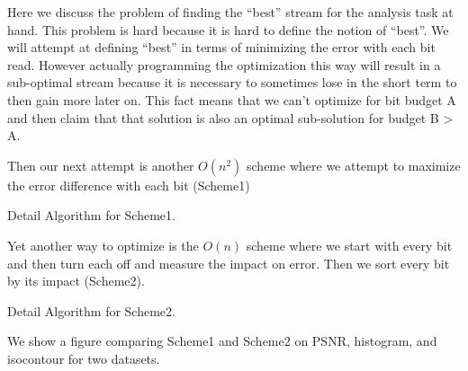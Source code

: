 Here we discuss the problem of finding the ``best'' stream for the analysis task at hand. This problem is hard because it is hard to define the notion of ``best''. We will attempt at defining ``best'' in terms of minimizing the error with each bit read. However actually programming the optimization this way will result in a sub-optimal stream because it is necessary to sometimes lose in the short term to then gain more later on. This fact means that we can't optimize for bit budget A and then claim that that solution is also an optimal sub-solution for budget B > A.

Then our next attempt is another $O(n^2)$ scheme where we attempt to maximize the error difference with each bit (Scheme1)

Detail Algorithm for Scheme1.

Yet another way to optimize is the $O(n)$ scheme where we start with every bit and then turn each off and measure the impact on error. Then we sort every bit by its impact (Scheme2).

Detail Algorithm for Scheme2.

We show a figure comparing Scheme1 and Scheme2 on PSNR, histogram, and isocontour for two datasets.
